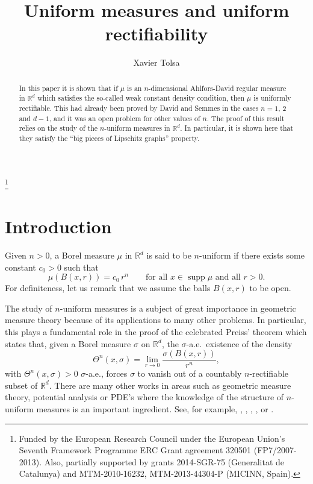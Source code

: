 \documentclass[11pt]{amsart}
\newcommand{\R}{{\mathbb R}}       %
\newcommand{\supp}{\operatorname{supp}}
\theoremstyle{definition}
\theoremstyle{remark}
\numberwithin{equation}{section}
\begin{document}
\title{Uniform measures and uniform rectifiability}
\author{Xavier Tolsa}

\address{Xavier Tolsa. Instituci\'{o} Catalana de Recerca i Estudis Avan\c{c}ats (ICREA) and Departament de
Ma\-te\-m\`a\-ti\-ques, Universitat Aut\`onoma de Bar\-ce\-lo\-na, Catalonia}

\thanks{Funded by the European Research
Council under the European Union's Seventh Framework Programme 
ERC Grant agreement 320501 (FP7/2007-2013). Also, partially supported by grants  2014-SGR-75 (Generalitat de Catalunya) and MTM-2010-16232,
MTM-2013-44304-P (MICINN, Spain).} 


\begin{abstract}
In this paper it is shown that if $\mu$ is an $n$-dimensional Ahlfors-David regular measure in
$\R^d$ which satisfies the so-called weak constant density condition, then $\mu$ is uniformly
rectifiable. This had already been proved by David and Semmes in the cases $n=1$, $2$ and $d-1$, and
it was an open problem for other values of $n$. The proof of this result relies on the study
of the $n$-uniform measures in $\R^d$. In particular, it is shown here that they satisfy the ``big pieces of Lipschitz graphs'' property.
\end{abstract}

\maketitle


\section{Introduction}

Given $n>0$, a Borel measure $\mu$ in $\R^d$ is said to be $n$-uniform if there exists some constant $c_0>0$
such that 
\begin{equation}\label{equnif21}
\mu(B(x,r))= c_0\, r^n\qquad\mbox{for all $x\in\supp\mu$ and all $r>0$.}
\end{equation}
For definiteness, let us remark that we assume
the balls $B(x,r)$ to be open.

The study of $n$-uniform measures is a subject of great importance in geometric measure theory because of its applications
to many other problems. In particular, this plays a fundamental role in the proof of the celebrated Preiss' theorem \cite{Pr} 
which
states that, given a Borel measure $\sigma$ on $\R^d$, the $\sigma$-a.e.\ existence of the density 
$$\Theta^n(x,\sigma)=\lim_{r\to 0}\frac{\sigma(B(x,r))}{r^n},$$
with $\Theta^n(x,\sigma)>0$ $\sigma$-a.e.,
forces $\sigma$ to vanish out of a countably $n$-rectifiable subset of $\R^d$. There are many other works 
in areas such as geometric measure theory, potential analysis or PDE's where the knowledge of the structure of $n$-uniform measures is an important ingredient. See, for example, \cite{Ba},
\cite{DKT}, \cite{KPT}, \cite{KT}, or \cite{PTT}.
\end{document}
